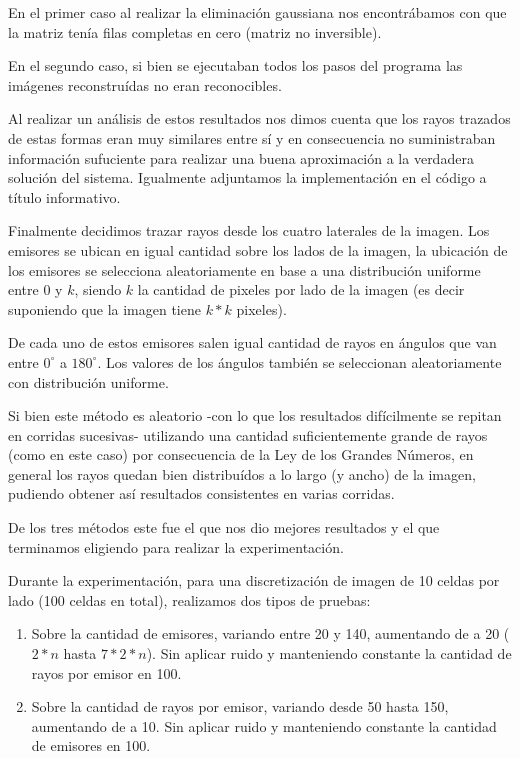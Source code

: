 \par En el primer caso al realizar la eliminación gaussiana nos encontrábamos con que la matriz tenía filas completas en cero (matriz no inversible).

\par En el segundo caso, si bien se ejecutaban todos los pasos del programa las imágenes reconstruídas no eran reconocibles.

Al realizar un análisis de estos resultados nos dimos cuenta que los rayos trazados de estas formas eran muy similares entre sí y en consecuencia no suministraban información sufuciente para realizar una buena aproximación a la verdadera solución del sistema. Igualmente adjuntamos la implementación en el código a título informativo.

\par Finalmente decidimos trazar rayos desde los cuatro laterales de la imagen. Los emisores se ubican en igual cantidad sobre los lados de la imagen, la ubicación de los emisores se selecciona aleatoriamente en base a una distribución uniforme entre $0$ y $k$, siendo $k$ la cantidad de pixeles por lado de la imagen (es decir suponiendo que la imagen tiene $k*k$ pixeles).

\par De cada uno de estos emisores salen igual cantidad de rayos en ángulos que van entre $0^{\circ}$ a $180^{\circ}$. Los valores de los ángulos también se seleccionan aleatoriamente con distribución uniforme.

\par Si bien este método es aleatorio -con lo que los resultados difícilmente se repitan en corridas sucesivas- utilizando una cantidad suficientemente grande de rayos (como en este caso) por consecuencia de la Ley de los Grandes Números, en general los rayos quedan bien distribuídos a lo largo (y ancho) de la imagen, pudiendo obtener así resultados consistentes en varias corridas.

\par De los tres métodos este fue el que nos dio mejores resultados y el que terminamos eligiendo para realizar la experimentación.

\par Durante la experimentación, para una discretización de imagen de 10 celdas por lado (100 celdas en total), realizamos dos tipos de pruebas:
\begin{enumerate}
\item Sobre la cantidad de emisores, variando entre 20 y 140, aumentando de a 20 ($2*n$ hasta $7*2*n$). Sin aplicar ruido y manteniendo constante la cantidad de rayos por emisor en 100.
\item Sobre la cantidad de rayos por emisor, variando desde 50 hasta 150, aumentando de a 10.  Sin aplicar ruido y manteniendo constante la cantidad de emisores en 100.
\end{enumerate}

